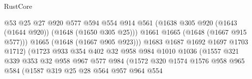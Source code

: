 \begin{lexlean}{RustCore}
\begin{coremodule}
                                        @53
                                        @25
                                        @27
                                        @920
                                        @577
                                        @594
                                        @554
                                        @914
                                        @561
                                        (@1638
                                          @305
                                          @920
                                          (@1643 (@1644 @920))
                                          (@1648 (@1650 @305 @25)))
                                        @1661
                                        @1665
                                        (@1648 (@1667 @915 @577)))
                                      @1665
                                      (@1648 (@1667 @905 @923)))
                                    @1683
                                    @1687
                                    @1692
                                    @1697
                                    @1703
                                    @1712)
                                  (@1723
                                    @933
                                    @354
                                    @402
                                    @32
                                    @958
                                    @984
                                    @1010
                                    @1036
                                    (@1557
                                      @321
                                      @339
                                      @353
                                      @32
                                      @958
                                      @967
                                      @577
                                      @984
                                      (@1572
                                        @320
                                        @1574
                                        @1576
                                        @958
                                        @965
                                        @584
                                        (@1587
                                          @319
                                          @25
                                          @28
                                          @564
                                          @957
                                          @964
                                          @554

\end{coremodule}
\end{lexlean}

